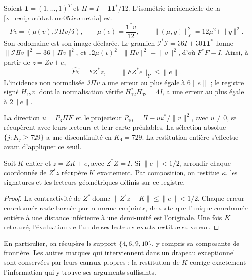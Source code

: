 Soient \(\mathbf1=(1,\ldots,1)^T\) et
\(\Pi=I-\mathbf1\mathbf1^*/12\). L’isométrie incidencielle de
la \cref{x_reciprocidad:nuc05:isometria} est
\begin{equation}
 Fv=(\mu(v),\mathcal I\Pi v/6),\qquad
 \mu(v)=\frac{\mathbf1^*v}{12},\qquad
 \|(\mu,y)\|_Y^2=12\mu^2+\|y\|^2.
 \label{x_reciprocidad:lib04:f-incidencia}
\end{equation}
Son codomaine est son image déclarée. Le gramien
\(\mathcal I^*\mathcal I=36I+30\mathbf1\mathbf1^*\) donne
\(\|\mathcal I\Pi v\|^2=36\|\Pi v\|^2\), et
\(12\mu(v)^2+\|\Pi v\|^2=\|v\|^2\), d’où \(F^*F=I\).
Ainsi, à partir de \(z=Zv+e\),
\begin{equation}
 \widehat{Fv}=FZ^*z,\qquad \|FZ^*e\|_Y\leq\|e\|.
 \label{x_reciprocidad:lib04:error-incidencia}
\end{equation}
L’incidence non normalisée \(\mathcal I\Pi v\) a une erreur au
plus égale à \(6\|e\|\) ; le registre signé \(H_{12}v\), dont la
normalisation vérifie \(H_{12}^*H_{12}=4I\), a une erreur au plus égale à
\(2\|e\|\).

La direction \(u=P_3\Pi K\) et le projecteur
\(P_{10}=\Pi-uu^*/\|u\|^2\), avec \(u\neq0\), se récupèrent
avec leurs lecteurs et leur carte préalables. La sélection absolue
\(\{j:K_j\geq729\}\) a une discontinuité en \(K_4=729\).
La restitution entière s’effectue avant d’appliquer ce seuil.

\begin{proposition}
\label{x_reciprocidad:lib04:prop-redondeo}
Soit \(K\) entier et \(z=ZK+e\), avec \(Z^*Z=I\). Si \(\|e\|<1/2\), arrondir chaque coordonnée de \(Z^*z\) récupère \(K\) exactement. Par composition, on restitue \(\kappa\), les signatures et les lecteurs géométriques définis sur ce registre.
\end{proposition}

\begin{proof}
La contractivité de \(Z^*\) donne
\(\|Z^*z-K\|\leq\|e\|<1/2\). Chaque erreur coordonnée reste
bornée par la norme conjointe, de sorte que l’unique coordonnée entière
à une distance inférieure à une demi-unité est l’originale. Une fois
\(K\) retrouvé, l’évaluation de l’un de ses lecteurs exacts
restitue sa valeur.
\end{proof}

En particulier, on récupère le support \(\{4,6,9,10\}\), y compris
sa composante de frontière. Les autres marques qui interviennent dans un
drapeau exceptionnel sont conservées par leurs canaux propres : la
restitution de \(K\) corrige exactement l’information qui y trouve
ses arguments suffisants.

